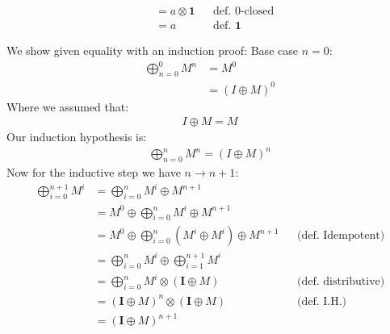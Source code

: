 \documentclass[a4paper,12pt]{ETHexercise}
\begin{document}
\begin{question}
\begin{subquestion}
\begin{align}
			           & = a \otimes \mathbf{1}                                  &  & \text{def. 0-closed}     \\
			           & = a                                                     &  & \text{def. $\mathbf{1}$}
		\end{align}
	\end{subquestion}
	\begin{subquestion}
		We show given equality with an induction proof:
		Base case $n = 0$:
		\begin{align}
			\bigoplus_{n=0}^{0} M^n & = M^0                         \\
			                        & = \left( I \oplus M \right)^0
		\end{align}
		Where we assumed that:
		\begin{align}
			I \oplus M = M
		\end{align}
		Our induction hypothesis is:
		\begin{align}
			\bigoplus_{n=0}^{n} M^n = \left( I \oplus M \right)^{n}
		\end{align}
		Now for the inductive step we have $n \rightarrow n+1$:
		\begin{align}
			\bigoplus_{i=0}^{n+1} M^i & = \bigoplus_{i=0}^{n} M^i \oplus M^{n+1}                                                                         \\
			                          & = M^0 \oplus \bigoplus_{i=0}^{n} M^i \oplus M^{n+1}                                                              \\
			                          & = M^0 \oplus\bigoplus_{i=0}^{n} \left(  M^i \oplus M^i \right) \oplus M^{n+1}    &  & \text{(def. Idempotent)}   \\
			                          & = \bigoplus_{i=0}^{n} M^i \oplus \bigoplus_{i=1}^{n+1} M^i                                                       \\
			                          & = \bigoplus_{i=0}^{n} M^{i} \otimes \left( \mathbf{I} \oplus M\right)            &  & \text{(def. distributive)} \\
			                          & = \left( \mathbf{I} \oplus M \right)^n \otimes \left( \mathbf{I} \oplus M\right) &  & \text{(def. I.H.)}         \\
			                          & = \left( \mathbf{I} \oplus M \right)^{n+1}
		\end{align}
	\end{subquestion}
	\begin{subquestion}

\end{subquestion}
\end{question}
\end{document}
